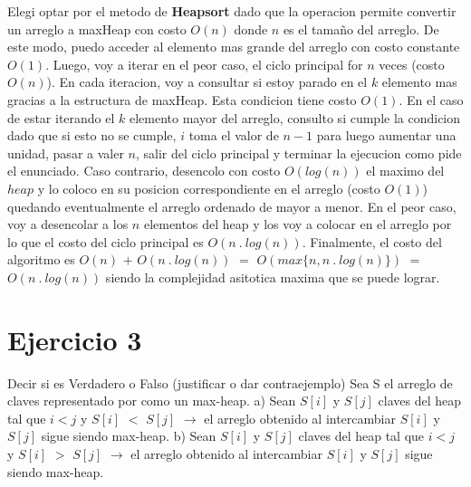 \documentclass[10pt,a4paper]{article}
\begin{document}
Elegi optar por el metodo de \textbf{Heapsort} dado que la operacion  permite convertir un arreglo a maxHeap con costo $O(n)$ donde $n$ es el tamaño del arreglo. De este modo, puedo acceder al elemento mas grande del arreglo con costo constante $O(1)$. 
\newline
\newline
Luego, voy a iterar en el peor caso, el ciclo principal for $n$ veces (costo $O(n)$). En cada iteracion, voy a consultar si estoy parado en el $k$ elemento mas gracias a la estructura de maxHeap. Esta condicion tiene costo $O(1)$. En el caso de estar iterando el $k$ elemento mayor del arreglo, consulto si cumple la condicion  dado que si esto no se cumple, $i$ toma el valor de $n-1$ para luego aumentar una unidad, pasar a valer $n$, salir del ciclo principal y terminar la ejecucion como pide el enunciado. Caso contrario, desencolo con costo $O(log(n))$ el maximo del $heap$ y lo coloco en su posicion correspondiente en el arreglo (costo $O(1)$) quedando eventualmente el arreglo ordenado de mayor a menor.
\newline
\newline
En el peor caso, voy a desencolar a los $n$ elementos del heap y los voy a colocar en el arreglo por lo que el costo del ciclo principal es $O(n ~.~ log(n))$. 
\newline
\newline
Finalmente, el costo del algoritmo es $O(n)$ $+$ $O(n ~.~ log(n))$ $=$ $O(max\{n,n ~.~ log(n)\})$ $=$ $O(n ~.~ log(n))$ siendo la complejidad asitotica maxima que se puede lograr. 
\newpage

\section{Ejercicio 3}

Decir si es Verdadero o Falso (justificar o dar contraejemplo)
\newline
\newline
Sea S el arreglo de claves representado por como un max-heap.
\newline
\newline
a) Sean $S[i]$ y $S[j]$ claves del heap tal que $i < j$ y $S[i]$ $<$ $S[j]$ $\rightarrow$ el arreglo obtenido al intercambiar $S[i]$ y $S[j]$ sigue siendo max-heap.
\newline
\newline
b) Sean $S[i]$ y $S[j]$ claves del heap tal que $i < j$ y $S[i]$ $>$ $S[j]$ $\rightarrow$ el arreglo obtenido al intercambiar $S[i]$ y $S[j]$ sigue siendo max-heap.
\newline
\newline
\end{document}
